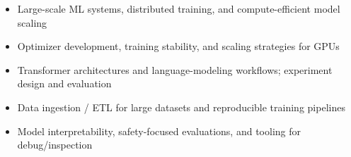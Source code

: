 \begin{itemize}\footnotesize
    \item Large-scale ML systems, distributed training, and compute-efficient model scaling
    \item Optimizer development, training stability, and scaling strategies for GPUs
    \item Transformer architectures and language-modeling workflows; experiment design and evaluation
    \item Data ingestion / ETL for large datasets and reproducible training pipelines
    \item Model interpretability, safety-focused evaluations, and tooling for debug/inspection
\end{itemize}






















